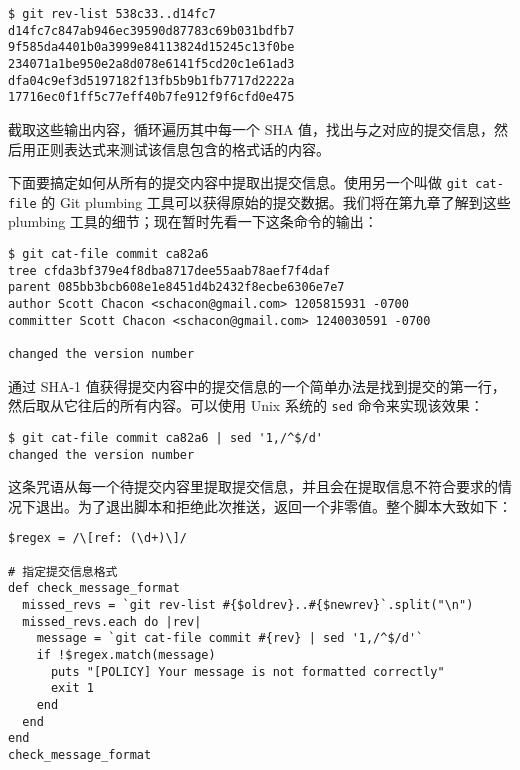 \documentclass[a4paper]{book}
\begin{document}
\begin{shaded}\begin{verbatim}
$ git rev-list 538c33..d14fc7
d14fc7c847ab946ec39590d87783c69b031bdfb7
9f585da4401b0a3999e84113824d15245c13f0be
234071a1be950e2a8d078e6141f5cd20c1e61ad3
dfa04c9ef3d5197182f13fb5b9b1fb7717d2222a
17716ec0f1ff5c77eff40b7fe912f9f6cfd0e475
\end{verbatim}\end{shaded}

截取这些输出内容，循环遍历其中每一个 SHA 值，找出与之对应的提交信息，然后用正则表达式来测试该信息包含的格式话的内容。

下面要搞定如何从所有的提交内容中提取出提交信息。使用另一个叫做 \texttt{git cat-file} 的 Git plumbing 工具可以获得原始的提交数据。我们将在第九章了解到这些 plumbing 工具的细节；现在暂时先看一下这条命令的输出：

\begin{shaded}\begin{verbatim}
$ git cat-file commit ca82a6
tree cfda3bf379e4f8dba8717dee55aab78aef7f4daf
parent 085bb3bcb608e1e8451d4b2432f8ecbe6306e7e7
author Scott Chacon <schacon@gmail.com> 1205815931 -0700
committer Scott Chacon <schacon@gmail.com> 1240030591 -0700

changed the version number
\end{verbatim}\end{shaded}

通过 SHA-1 值获得提交内容中的提交信息的一个简单办法是找到提交的第一行，然后取从它往后的所有内容。可以使用 Unix 系统的 \texttt{sed} 命令来实现该效果：

\begin{shaded}\begin{verbatim}
$ git cat-file commit ca82a6 | sed '1,/^$/d'
changed the version number
\end{verbatim}\end{shaded}

这条咒语从每一个待提交内容里提取提交信息，并且会在提取信息不符合要求的情况下退出。为了退出脚本和拒绝此次推送，返回一个非零值。整个脚本大致如下：

\begin{shaded}\begin{verbatim}
$regex = /\[ref: (\d+)\]/

# 指定提交信息格式
def check_message_format
  missed_revs = `git rev-list #{$oldrev}..#{$newrev}`.split("\n")
  missed_revs.each do |rev|
    message = `git cat-file commit #{rev} | sed '1,/^$/d'`
    if !$regex.match(message)
      puts "[POLICY] Your message is not formatted correctly"
      exit 1
    end
  end
end
check_message_format
\end{verbatim}\end{shaded}
\end{document}
